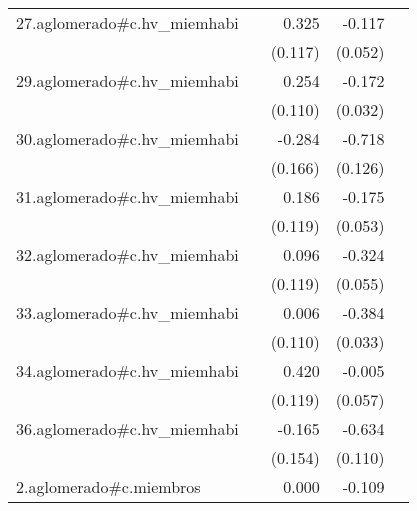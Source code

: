 {\begin{longtable}{l*{4}{D{.}{.}{-1}}}
\addlinespace
27.aglomerado#c.hv\_miemhabi&                     &       0.325\sym{**} &      -0.117\sym{*}  &                     \\
            &                     &     (0.117)         &     (0.052)         &                     \\
\addlinespace
29.aglomerado#c.hv\_miemhabi&                     &       0.254\sym{*}  &      -0.172\sym{***}&                     \\
            &                     &     (0.110)         &     (0.032)         &                     \\
\addlinespace
30.aglomerado#c.hv\_miemhabi&                     &      -0.284         &      -0.718\sym{***}&                     \\
            &                     &     (0.166)         &     (0.126)         &                     \\
\addlinespace
31.aglomerado#c.hv\_miemhabi&                     &       0.186         &      -0.175\sym{***}&                     \\
            &                     &     (0.119)         &     (0.053)         &                     \\
\addlinespace
32.aglomerado#c.hv\_miemhabi&                     &       0.096         &      -0.324\sym{***}&                     \\
            &                     &     (0.119)         &     (0.055)         &                     \\
\addlinespace
33.aglomerado#c.hv\_miemhabi&                     &       0.006         &      -0.384\sym{***}&                     \\
            &                     &     (0.110)         &     (0.033)         &                     \\
\addlinespace
34.aglomerado#c.hv\_miemhabi&                     &       0.420\sym{***}&      -0.005         &                     \\
            &                     &     (0.119)         &     (0.057)         &                     \\
\addlinespace
36.aglomerado#c.hv\_miemhabi&                     &      -0.165         &      -0.634\sym{***}&                     \\
            &                     &     (0.154)         &     (0.110)         &                     \\
\addlinespace
2.aglomerado#c.miembros&                     &       0.000         &      -0.109\sym{***}&                     \\

\end{longtable}}
